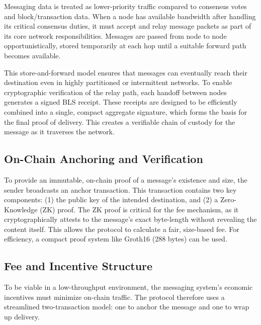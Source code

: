\documentclass{article}
\begin{document}
Messaging data is treated as lower-priority traffic compared to consensus votes and block/transaction data. When a node has available bandwidth after handling its critical consensus duties, it must accept and relay message packets as part of its core network responsibilities. Messages are passed from node to node opportunistically, stored temporarily at each hop until a suitable forward path becomes available.

This store-and-forward model ensures that messages can eventually reach their destination even in highly partitioned or intermittent networks. To enable cryptographic verification of the relay path, each handoff between nodes generates a signed BLS receipt. These receipts are designed to be efficiently combined into a single, compact aggregate signature, which forms the basis for the final proof of delivery. This creates a verifiable chain of custody for the message as it traverses the network.

\subsection{On-Chain Anchoring and Verification}

To provide an immutable, on-chain proof of a message's existence and size, the sender broadcasts an anchor transaction. This transaction contains two key components: (1) the public key of the intended destination, and (2) a Zero-Knowledge (ZK) proof. The ZK proof is critical for the fee mechanism, as it cryptographically attests to the message's exact byte-length without revealing the content itself. This allows the protocol to calculate a fair, size-based fee. For efficiency, a compact proof system like Groth16 (288 bytes) can be used.

\subsection{Fee and Incentive Structure}

To be viable in a low-throughput environment, the messaging system's economic incentives must minimize on-chain traffic. The protocol therefore uses a streamlined two-transaction model: one to anchor the message and one to wrap up delivery.
\end{document}
